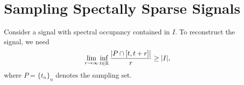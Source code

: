 \section{Sampling Spectally Sparse Signals}
\begin{boxtheorem}
    Consider a signal with spectral occupancy
    contained in $I$. To reconstruct the signal,
    we need
    $$
    \lim_{r\to\infty}\inf_{t\in\mathbb{R}}\frac{|P\cap [t,t+r]|}
    {r}\geq|I|,
    $$
    where $P=\{t_n\}_n$ denotes the sampling set.
\end{boxtheorem}